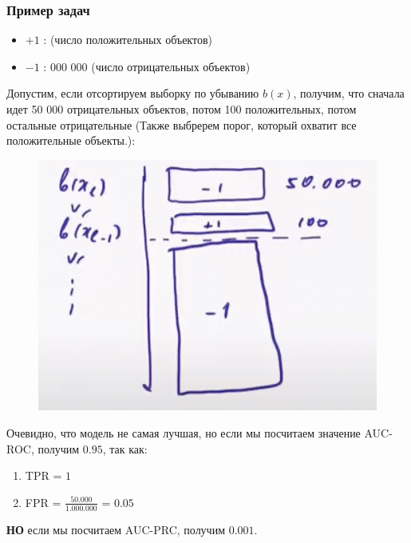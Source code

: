 

                \subsubsection{Пример задач}

                    \begin{itemize}
                        \item $+1$ :  (число положительных объектов)
                        \item $-1$ :  000 000  (число отрицательных объектов)
                    \end{itemize}
                    Допустим, если отсортируем выборку по убыванию $b(x)$, получим, что сначала идет 50 000 отрицательных объектов, потом 100 положительных, потом остальные отрицательные (Также выбререм порог, который охватит все положительные объекты.):

                    \begin{figure}[H]
                        \centering
                        \includegraphics[width=0.35 \textwidth]{images/5lecture/Example_1.png}
                    \end{figure}

                    Очевидно, что модель не самая лучшая, но если мы посчитаем значение AUC-ROC, получим $0.95$, так как:
                    \begin{enumerate}
                        \item TPR = $1$
                        \item FPR = $\frac{50.000}{1.000.000}$ = $0.05$
                    \end{enumerate}

                    \textbf{НО} если мы посчитаем AUC-PRC, получим $0.001$.\\




